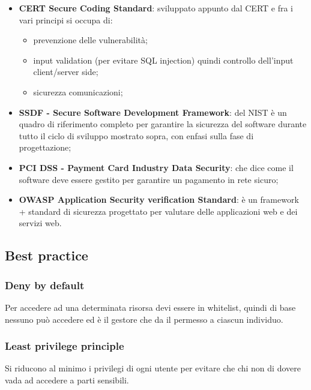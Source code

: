 \begin{itemize}
\item
  \textbf{CERT Secure Coding Standard}: sviluppato appunto dal CERT e
  fra i vari principi si occupa di:

  \begin{itemize}
  \item
    prevenzione delle vulnerabilità;
  \item
    input validation (per evitare SQL injection) quindi controllo
    dell'input client/server side;
  \item
    sicurezza comunicazioni;
  \end{itemize}
\item
  \textbf{SSDF - Secure Software Development Framework}: del NIST è un
  quadro di riferimento completo per garantire la sicurezza del software
  durante tutto il ciclo di sviluppo mostrato sopra, con enfasi sulla
  fase di progettazione;
\item
  \textbf{PCI DSS - Payment Card Industry Data Security}: che dice come
  il software deve essere gestito per garantire un pagamento in rete
  sicuro;
\item
  \textbf{OWASP Application Security verification Standard}: è un
  framework + standard di sicurezza progettato per valutare delle
  applicazioni web e dei servizi web.
\end{itemize}

\subsection{Best practice}\label{best-practice}

\subsubsection{Deny by default}\label{deny-by-default}

Per accedere ad una determinata risorsa devi essere in whitelist, quindi
di base nessuno può accedere ed è il gestore che da il permesso a
ciascun individuo.

\subsubsection{Least privilege
principle}\label{least-privilege-principle}

Si riducono al minimo i privilegi di ogni utente per evitare che chi non
di dovere vada ad accedere a parti sensibili.

